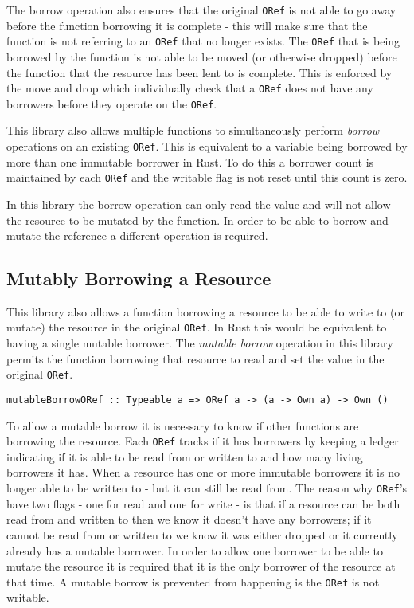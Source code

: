 \documentclass[onehalf,11pt]{beavtex}
\begin{document}
The borrow operation also ensures that the original \texttt{ORef} is not able to go away
before the function borrowing it is complete - this will make sure that the
function is not referring to an \texttt{ORef} that no longer exists.  The \texttt{ORef} that is
being borrowed by the function is not able to be moved (or otherwise dropped)
before the function that the resource has been lent to is complete. This is
enforced by the move and drop which individually check that
a \texttt{ORef} does not have any borrowers before they operate on the \texttt{ORef}.

This library also allows multiple functions to simultaneously perform
\textit{borrow} operations on an existing \texttt{ORef}. This is equivalent to a variable
being borrowed by more than one immutable borrower in Rust. To do this a
borrower count is maintained by each \texttt{ORef} and the writable flag is not
reset until this count is zero.

In this library the borrow operation can only read the value and will not allow
the resource to be mutated by the function.  In order to be able to borrow and
mutate the reference a different operation is required.

\subsection{Mutably Borrowing a Resource}

This library also allows a function borrowing a resource to be able to
write to (or mutate) the resource in the original \texttt{ORef}.  In Rust this would be
equivalent to having a single mutable borrower.  The \textit{mutable borrow}
operation in this library permits the function borrowing that resource to read
and set the value in the original \texttt{ORef}.

\begin{verbatim}
mutableBorrowORef :: Typeable a => ORef a -> (a -> Own a) -> Own ()
\end{verbatim}

To allow a mutable borrow it is necessary to know if other functions are
borrowing the resource.  Each \texttt{ORef} tracks if it has borrowers by keeping a
ledger indicating if it is able to be read from or written to and how many
living borrowers it has.  When a resource has one or more immutable borrowers it
is no longer able to be written to - but it can still be read from.
The reason why \texttt{ORef}'s have two flags - one for read and one for write - is that
if a resource can be both read from and written to then we know it doesn't have
any borrowers; if it cannot be read from or written to we know it was either
dropped or it currently already has a mutable borrower.
In order to allow one borrower to be able to mutate the resource it is required
that it is the only borrower of the resource at that time. %
A mutable borrow is prevented from happening is the \texttt{ORef} is not writable.
\end{document}
